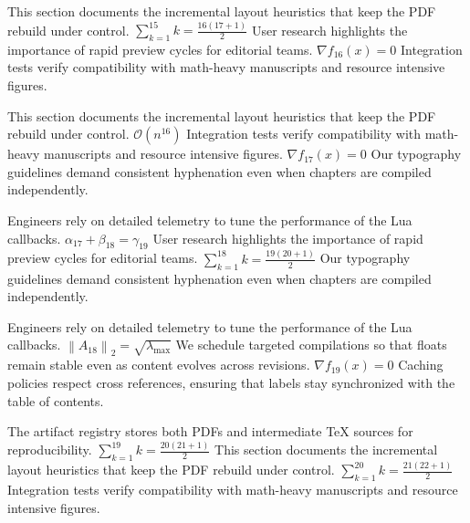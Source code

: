 \documentclass[12pt,a4paper,twocolumn]{article}
\newcommand{\paraid}[1]{\par\noindent\hypertarget{#1}{\ignorespaces}}
\begin{document}
\paraid{sec12-p3}This section documents the incremental layout heuristics that keep the PDF rebuild under control. $\sum_{k=1}^{15} k = \frac{16(17+1)}{2}$ User research highlights the importance of rapid preview cycles for editorial teams. $\nabla f_{16}(x) = 0$ Integration tests verify compatibility with math-heavy manuscripts and resource intensive figures.
\par

\paraid{sec12-p4}This section documents the incremental layout heuristics that keep the PDF rebuild under control. $\mathcal{O}(n^{16})$ Integration tests verify compatibility with math-heavy manuscripts and resource intensive figures. $\nabla f_{17}(x) = 0$ Our typography guidelines demand consistent hyphenation even when chapters are compiled independently.
\par

\paraid{sec12-p5}Engineers rely on detailed telemetry to tune the performance of the Lua callbacks. $\alpha_{17} + \beta_{18} = \gamma_{19}$ User research highlights the importance of rapid preview cycles for editorial teams. $\sum_{k=1}^{18} k = \frac{19(20+1)}{2}$ Our typography guidelines demand consistent hyphenation even when chapters are compiled independently.
\par

\paraid{sec12-p6}Engineers rely on detailed telemetry to tune the performance of the Lua callbacks. $\left\|A_{18}\right\|_{2} = \sqrt{\lambda_{\max}}$ We schedule targeted compilations so that floats remain stable even as content evolves across revisions. $\nabla f_{19}(x) = 0$ Caching policies respect cross references, ensuring that labels stay synchronized with the table of contents.
\par

\paraid{sec12-p7}The artifact registry stores both PDFs and intermediate TeX sources for reproducibility. $\sum_{k=1}^{19} k = \frac{20(21+1)}{2}$ This section documents the incremental layout heuristics that keep the PDF rebuild under control. $\sum_{k=1}^{20} k = \frac{21(22+1)}{2}$ Integration tests verify compatibility with math-heavy manuscripts and resource intensive figures.
\par
\end{document}
